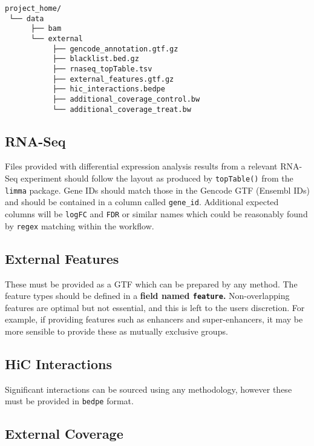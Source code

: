 \documentclass[
]{book}
\begin{document}
\begin{verbatim}
project_home/
 └── data
      ├── bam 
      └── external
           ├── gencode_annotation.gtf.gz
           ├── blacklist.bed.gz
           ├── rnaseq_topTable.tsv
           ├── external_features.gtf.gz
           ├── hic_interactions.bedpe
           ├── additional_coverage_control.bw
           └── additional_coverage_treat.bw
\end{verbatim}

\hypertarget{rna-seq}{%
\subsection{RNA-Seq}\label{rna-seq}}

Files provided with differential expression analysis results from a relevant RNA-Seq experiment should follow the layout as produced by \texttt{topTable()} from the \texttt{limma} package\citep{limma}.
Gene IDs should match those in the Gencode GTF (Ensembl IDs) and should be contained in a column called \texttt{gene\_id}.
Additional expected columns will be \texttt{logFC} and \texttt{FDR} or similar names which could be reasonably found by \texttt{regex} matching within the workflow.

\hypertarget{external-features}{%
\subsection{External Features}\label{external-features}}

These must be provided as a GTF which can be prepared by any method.
The feature types should be defined in a \textbf{field named \texttt{feature}.}
Non-overlapping features are optimal but not essential, and this is left to the users discretion.
For example, if providing features such as enhancers and super-enhancers\citep{rose}, it may be more sensible to provide these as mutually exclusive groups.

\hypertarget{hic-interactions}{%
\subsection{HiC Interactions}\label{hic-interactions}}

Significant interactions can be sourced using any methodology, however these must be provided in \texttt{bedpe} format.

\hypertarget{external-coverage}{%
\subsection{External Coverage}\label{external-coverage}}
\end{document}
